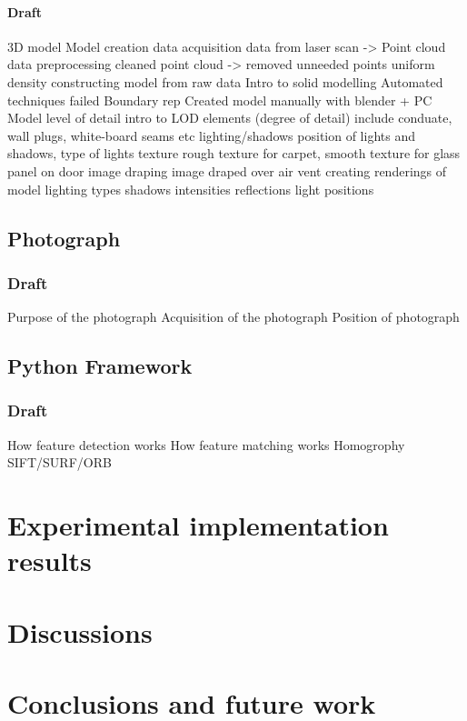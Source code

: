 \documentclass[11pt,a4paper]{report}
\begin{document}
			\subsubsection{Draft}
				3D model
					Model creation
						data acquisition
							data from laser scan -> Point cloud
						data preprocessing
							cleaned point cloud -> removed unneeded points
							uniform density
						constructing model from raw data
							Intro to solid modelling
							Automated techniques failed
							Boundary rep
							Created model manually with blender + PC
					Model level of detail
						intro to LOD
						elements (degree of detail)
							include conduate, wall plugs, white-board seams etc
						lighting/shadows
							position of lights and shadows, type of lights
						texture
							rough texture for carpet, smooth texture for glass panel on door
						image draping
							image draped over air vent
					creating renderings of model
						lighting types
						shadows
						intensities
						reflections
						light positions
		\section{Photograph}
			\subsection{Draft}
				Purpose of the photograph
				Acquisition of the photograph
				Position of photograph
				
			
		\section{Python Framework}
			\subsection{Draft}
				How feature detection works
				How feature matching works
				Homogrophy
				SIFT/SURF/ORB
					

\chapter{Experimental implementation results}

\chapter{Discussions}

\chapter{Conclusions and future work}

\newpage
\printbibliography
\end{document}
